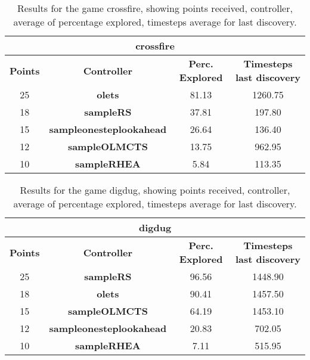 \begin{table*}[!t]
\begin{center}
\begin{tabular}{|c|c|c|c|}
\multicolumn{4}{c}{\textbf{crossfire}}\\
\hline
\textbf{Points} & \textbf{Controller} & \textbf{Perc. Explored} &  \textbf{Timesteps last discovery}\\
\hline
25 & \textbf{olets} & 81.13 & 1260.75
 \\
\hline
18 & \textbf{sampleRS} & 37.81 & 197.80
 \\
\hline
15 & \textbf{sampleonesteplookahead} & 26.64 & 136.40
 \\
\hline
12 & \textbf{sampleOLMCTS} & 13.75 & 962.95
 \\
\hline
10 & \textbf{sampleRHEA} & 5.84 & 113.35
 \\
\hline
\end{tabular}
\caption{Results for the game crossfire, showing points received, controller, average of percentage explored, timesteps average for last discovery.}
\label{tab:weights}
\end{center}
\end{table*}
\begin{table*}[!t]
\begin{center}
\begin{tabular}{|c|c|c|c|}
\multicolumn{4}{c}{\textbf{digdug}}\\
\hline
\textbf{Points} & \textbf{Controller} & \textbf{Perc. Explored} &  \textbf{Timesteps last discovery}\\
\hline
25 & \textbf{sampleRS} & 96.56 & 1448.90
 \\
\hline
18 & \textbf{olets} & 90.41 & 1457.50
 \\
\hline
15 & \textbf{sampleOLMCTS} & 64.19 & 1453.10
 \\
\hline
12 & \textbf{sampleonesteplookahead} & 20.83 & 702.05
 \\
\hline
10 & \textbf{sampleRHEA} & 7.11 & 515.95
 \\
\hline
\end{tabular}
\caption{Results for the game digdug, showing points received, controller, average of percentage explored, timesteps average for last discovery.}
\label{tab:weights}
\end{center}
\end{table*}
